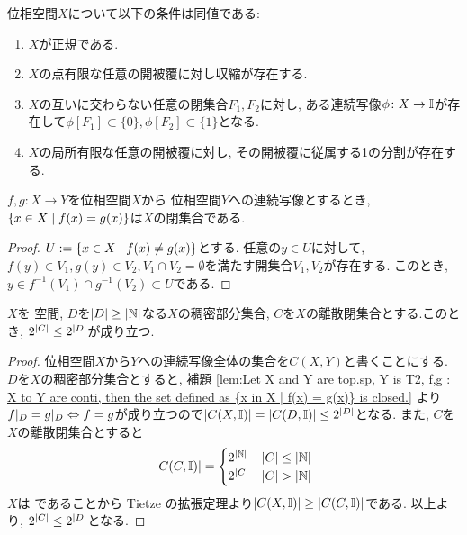 \documentclass[uplatex, dvipdfmx, a4paper, 12pt, class=jsbook, crop=false]{standalone}
\begin{document}
\begin{theorem}
	位相空間$ X $について以下の条件は同値である:
	\begin{enumerate}
		\item $ X $が正規である.
		\item $ X $の点有限な任意の開被覆に対し収縮が存在する.
		\item  $ X $の互いに交わらない任意の閉集合$ F_1, F_2 $に対し, ある連続写像$ \phi \colon X \rightarrow \mathbb{I} $が存在して$ \phi[F_1] \subset \{0\}, \phi[F_2] \subset \{1\} $となる.
		\item $ X $の局所有限な任意の開被覆に対し, その開被覆に従属する1の分割が存在する.
	\end{enumerate}
\end{theorem}

\begin{lemma}
	\label{lem:Let X and Y are top.sp, Y is T2, f,g : X to Y are conti, then the set defined as {x in X | f(x) = g(x)} is closed.}
	$f, g \colon X \to Y $を位相空間$ X $から  位相空間$ Y $への連続写像とするとき, $ \setcomp{x \in X}{f(x) = g(x)} $は$ X $の閉集合である.
\end{lemma}

\begin{proof}
	$ U \defeq \setcomp{x \in X}{f(x) \neq g(x)} $とする. 任意の$ y \in U $に対して, $ f(y) \in V_1, g(y) \in V_2, V_1 \cap V_2 = \emptyset $を満たす開集合$ V_1, V_2 $が存在する. このとき, $ y \in f^{-1}(V_1) \cap g^{-1}(V_2) \subset U $である.
\end{proof}

\begin{theorem}
	\label{thm:Jone's Lemma}
	$ X $を  空間, $ D $を$ \left|D\right| \geq \left|\mathbb{N}\right| $なる$ X $の稠密部分集合, $ C $を$ X $の離散閉集合とする.このとき, $2^{\left|C\right|} \leq 2^{\left|D\right|} $が成り立つ.
\end{theorem}

\begin{proof}
	位相空間$ X $から$ Y $への連続写像全体の集合を$ C(X, Y) $と書くことにする. $ D $を$ X $の稠密部分集合とすると, 補題 \ref{lem:Let X and Y are top.sp, Y is T2, f,g : X to Y are conti, then the set defined as {x in X | f(x) = g(x)} is closed.} より$ f|_D = g|_D  \Leftrightarrow f =g $が成り立つので$ \left|C(X, \mathbb{I})\right| = \left|C(D, \mathbb{I})\right| \leq 2^{\left|D\right|} $となる. また, $ C $を$ X $の離散閉集合とすると
	$$ \left|C(C, \mathbb{I})\right| =\begin{cases}
	2^{\left|\mathbb{N}\right|} & \left|C\right| \leq \left|\mathbb{N}\right|\\
	2^{\left|C\right|} & \left|C\right| > \left|\mathbb{N}\right|
	\end{cases} $$
	$ X $は  であることから Tietze の拡張定理より$ \left|C(X, \mathbb{I})\right| \geq \left|C(C, \mathbb{I})\right| $である. 以上より, $ 2^{\left|C\right|} \leq 2^{\left|D\right|} $となる.
\end{proof}
\end{document}
